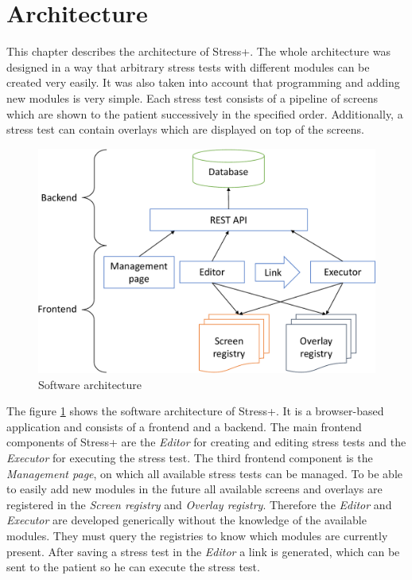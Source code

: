 \section{Architecture}
\label{sec:architecture}

This chapter describes the architecture of Stress+.
The whole architecture was designed in a way that arbitrary stress tests with different modules can be created very easily.
It was also taken into account that programming and adding new modules is very simple.
Each stress test consists of a pipeline of screens which are shown to the patient successively in the specified order.
Additionally, a stress test can contain overlays which are displayed on top of the screens.

\begin{figure}[htb]
  \centering
  \includegraphics[width=\textwidth]{figures/Architecture-crop}
  \caption{Software architecture}
  \label{fig:software-architecture}
\end{figure}

The figure \ref{fig:software-architecture} shows the software architecture of Stress+.
It is a browser-based application and consists of a frontend and a backend.
The main frontend components of Stress+ are the \textit{Editor} for creating and editing stress tests and the \textit{Executor} for executing the stress test.
The third frontend component is the \textit{Management page}, on which all available stress tests can be managed.
To be able to easily add new modules in the future all available screens and overlays are registered in the \textit{Screen registry} and \textit{Overlay registry}. 
Therefore the \textit{Editor} and \textit{Executor} are developed generically without the knowledge of the available modules.
They must query the registries to know which modules are currently present.
After saving a stress test in the \textit{Editor} a link is generated, which can be sent to the patient so he can execute the stress test.

